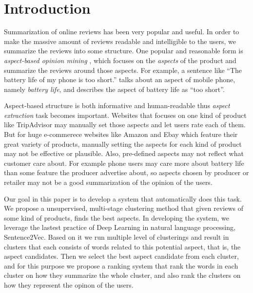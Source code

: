 \section{Introduction}


Summarization of online reviews has been very popular and useful. In order to make the massive amount of reviews readable and intelligible to the users, we summarize the reviews into some structure. One popular and reasonable form is \emph{aspect-based opinion mining}\cite{hu2004mining} , which focuses on the \emph{aspects} of the product and summarize the reviews around those aspects. For example, a sentence like ``The battery life of my phone is too short.'' talks about an aspect of mobile phone, namely \emph{battery life}, and describes the aspect of battery life as ``too short''. 

Aspect-based structure is both informative and human-readable thus \emph{aspect extraction} task becomes important. Websites that focuses on one kind of product like TripAdvisor may manually set those aspects and let users rate each of them. But for huge e-commerece websites like Amazon and Ebay which feature their great variety of products, manually setting the aspects for each kind of product may not be effective or plausible. Also, pre-defined aspects may not reflect what customer care about. For example phone users may care more about battery life than some feature the producer advertise about, so aspects chosen by producer or retailer may not be a good summarization of the opinion of the users.

Our goal in this paper is to develop a system that automatically does this task. We propose a unsupervised, multi-stage clustering method that given reviews of some kind of products, finds the best aspects. In developing the system, we leverage the lastest practice of Deep Learning in natural language processing, Sentence2Vec. Based on it we run multiple level of clusterings and result in clusters that each consists of words related to this potential aspect, that is, the aspect candidates. Then we select the best aspect candidate from each cluster, and for this purpose we propose a ranking system that rank the words in each cluster on how they summarize the whole cluster, and also rank the clusters on how they represent the opinon of the users.
